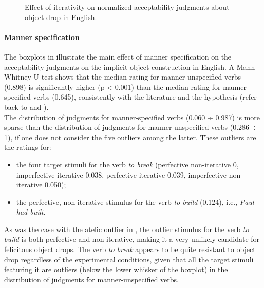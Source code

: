 \begin{figure}[htb]
\caption{Effect of iterativity on normalized acceptability judgments about object drop in English.}
    
\end{figure}

\paragraph{Manner specification}
The boxplots in  illustrate the main effect of manner specification on the acceptability judgments on the implicit object construction in English. A Mann-Whitney U test shows that the median rating for manner-unspecified verbs (0.898) is significantly higher (p < 0.001) than the median rating for manner-specified verbs (0.645), consistently with the literature and the hypothesis (refer back to  and ).\\
The distribution of judgments for manner-specified verbs (0.060 $\div$ 0.987) is more sparse than the distribution of judgments for manner-unspecified verbs (0.286 $\div$ 1), if one does not consider the five outliers among the latter. These outliers are the ratings for:
\begin{itemize}
    \item the four target stimuli for the verb \textit{to break} (perfective non-iterative 0, imperfective iterative 0.038, perfective iterative 0.039, imperfective non-iterative 0.050);
    \item the perfective, non-iterative stimulus for the verb \textit{to build} (0.124), i.e., \textit{Paul had built}.
\end{itemize}
As was the case with the atelic outlier in , the outlier stimulus for the verb \textit{to build} is both perfective and non-iterative, making it a very unlikely candidate for felicitous object drops. The verb \textit{to break} appears to be quite resistant to object drop regardless of the experimental conditions, given that all the target stimuli featuring it are outliers (below the lower whisker of the boxplot) in the distribution of judgments for manner-unspecified verbs.

